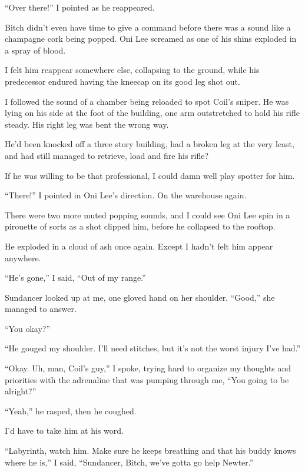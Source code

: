``Over there!'' I pointed as he reappeared.



Bitch didn't even have time to give a command before there was a sound like a champagne cork being popped.  Oni Lee screamed as one of his shins exploded in a spray of blood.



I felt him reappear somewhere else, collapsing to the ground, while his predecessor endured having the kneecap on its good leg shot out.



I followed the sound of a chamber being reloaded to spot Coil's sniper.  He was lying on his side at the foot of the building, one arm outstretched to hold his rifle steady.  His right leg was bent the wrong way.



He'd been knocked off a three story building, had a broken leg at the very least, and had still managed to retrieve, load and fire his rifle?



If he was willing to be that professional, I could damn well play spotter for him.



``There!'' I pointed in Oni Lee's direction.  On the warehouse again.



There were two more muted popping sounds, and I could see Oni Lee spin in a pirouette of sorts as a shot clipped him, before he collapsed to the rooftop.



He exploded in a cloud of ash once again.  Except I hadn't felt him appear anywhere.



``He's gone,'' I said, ``Out of my range.''



Sundancer looked up at me, one gloved hand on her shoulder.  ``Good,'' she managed to answer.



``You okay?''



``He gouged my shoulder.  I'll need stitches, but it's not the worst injury I've had.''



``Okay.  Uh, man, Coil's guy,'' I spoke, trying hard to organize my thoughts and priorities with the adrenaline that was pumping through me, ``You going to be alright?''



``Yeah,'' he rasped, then he coughed.



I'd have to take him at his word.



``Labyrinth, watch him.  Make sure he keeps breathing and that his buddy knows where he is,'' I said, ``Sundancer, Bitch, we've gotta go help Newter.''





